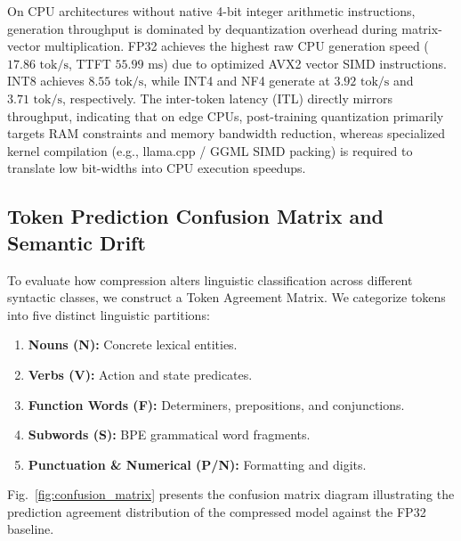 \documentclass[conference]{IEEEtran}
\begin{document}
On CPU architectures without native 4-bit integer arithmetic instructions, generation throughput is dominated by dequantization overhead during matrix-vector multiplication. FP32 achieves the highest raw CPU generation speed ($17.86\text{ tok/s}$, TTFT $55.99\text{ ms}$) due to optimized AVX2 vector SIMD instructions. INT8 achieves $8.55\text{ tok/s}$, while INT4 and NF4 generate at $3.92\text{ tok/s}$ and $3.71\text{ tok/s}$, respectively. The inter-token latency (ITL) directly mirrors throughput, indicating that on edge CPUs, post-training quantization primarily targets RAM constraints and memory bandwidth reduction, whereas specialized kernel compilation (e.g., llama.cpp / GGML SIMD packing) is required to translate low bit-widths into CPU execution speedups.

\subsection{Token Prediction Confusion Matrix and Semantic Drift}
To evaluate how compression alters linguistic classification across different syntactic classes, we construct a Token Agreement Matrix. We categorize tokens into five distinct linguistic partitions:
\begin{enumerate}
    \item \textbf{Nouns (N):} Concrete lexical entities.
    \item \textbf{Verbs (V):} Action and state predicates.
    \item \textbf{Function Words (F):} Determiners, prepositions, and conjunctions.
    \item \textbf{Subwords (S):} BPE grammatical word fragments.
    \item \textbf{Punctuation \& Numerical (P/N):} Formatting and digits.
\end{enumerate}

Fig.~\ref{fig:confusion_matrix} presents the confusion matrix diagram illustrating the prediction agreement distribution of the compressed model against the FP32 baseline.
\end{document}
